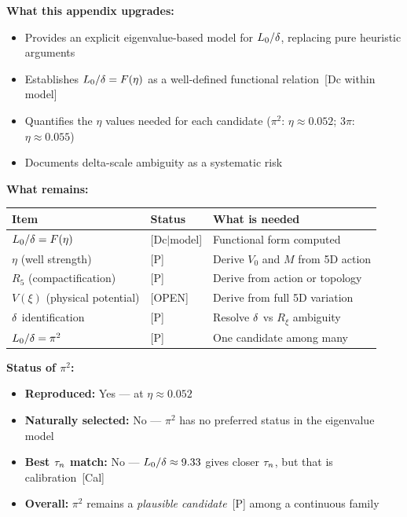 \begin{resultbox}[title=R1 Mode B+ Outcome]
    \textbf{What this appendix upgrades:}
    \begin{itemize}
        \item Provides an explicit eigenvalue-based model for $L_0/\delta$,
              replacing pure heuristic arguments
        \item Establishes $L_0/\delta = F(\eta)$ as a well-defined functional
              relation~[Dc within model]
        \item Quantifies the $\eta$ values needed for each candidate
              ($\pi^2$: $\eta \approx 0.052$; $3\pi$: $\eta \approx 0.055$)
        \item Documents delta-scale ambiguity as a systematic risk
    \end{itemize}

    \textbf{What remains:}

    \begin{center}
    \begin{tabular}{lll}
    \toprule
    \textbf{Item} & \textbf{Status} & \textbf{What is needed} \\
    \midrule
    $L_0/\delta = F(\eta)$ & [Dc$|$model] & Functional form computed \\
    $\eta$ (well strength)     & [P]          & Derive $V_0$ and $M$ from 5D action \\
    $R_5$ (compactification)   & [P]          & Derive from action or topology \\
    $V(\xi)$ (physical potential) & [OPEN]    & Derive from full 5D variation \\
    $\delta$ identification   & [P]          & Resolve $\delta$ vs $R_\xi$ ambiguity \\
    $L_0/\delta = \pi^2$   & [P]          & One candidate among many \\
    \bottomrule
    \end{tabular}
    \end{center}

    \textbf{Status of $\pi^2$:}
    \begin{itemize}
        \item \textbf{Reproduced:} Yes --- at $\eta \approx 0.052$
        \item \textbf{Naturally selected:} No --- $\pi^2$ has no preferred
              status in the eigenvalue model
        \item \textbf{Best $\tau_n$ match:} No --- $L_0/\delta \approx 9.33$
              gives closer $\tau_n$, but that is calibration~[Cal]
        \item \textbf{Overall:} $\pi^2$ remains a \emph{plausible candidate}~[P]
              among a continuous family
    \end{itemize}
\end{resultbox}
